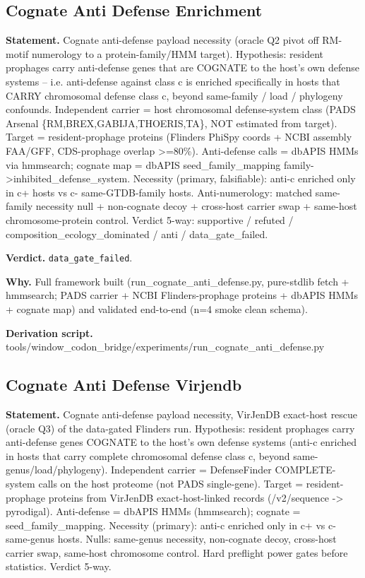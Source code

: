 \subsection{Cognate Anti Defense Enrichment}\label{sec:bridge-cognate-anti-defense-enrichment}
\textbf{Statement.} Cognate anti-defense payload necessity (oracle Q2 pivot off RM-motif numerology to a
protein-family/HMM target). Hypothesis: resident prophages carry anti-defense genes that are COGNATE
to the host's own defense systems -- i.e. anti-defense against class c is enriched specifically in
hosts that CARRY chromosomal defense class c, beyond same-family / load / phylogeny confounds.
Independent carrier = host chromosomal defense-system class (PADS Arsenal
\{RM,BREX,GABIJA,THOERIS,TA\}, NOT estimated from target). Target = resident-prophage proteins
(Flinders PhiSpy coords + NCBI assembly FAA/GFF, CDS-prophage overlap >=80\%). Anti-defense calls =
dbAPIS HMMs via hmmsearch; cognate map = dbAPIS seed\_family\_mapping
family->inhibited\_defense\_system. Necessity (primary, falsifiable): anti-c enriched only in c+
hosts vs c- same-GTDB-family hosts. Anti-numerology: matched same-family necessity null +
non-cognate decoy + cross-host carrier swap + same-host chromosome-protein control. Verdict 5-way:
supportive / refuted / composition\_ecology\_dominated / anti / data\_gate\_failed.

\textbf{Verdict.} \texttt{data\_gate\_failed}.

\textbf{Why.} Full framework built (run\_cognate\_anti\_defense.py, pure-stdlib fetch + hmmsearch; PADS carrier +
NCBI Flinders-prophage proteins + dbAPIS HMMs + cognate map) and validated end-to-end (n=4 smoke
clean schema).

\textbf{Derivation script.} tools/window\_codon\_bridge/experiments/run\_cognate\_anti\_defense.py

\subsection{Cognate Anti Defense Virjendb}\label{sec:bridge-cognate-anti-defense-virjendb}
\textbf{Statement.} Cognate anti-defense payload necessity, VirJenDB exact-host rescue (oracle Q3) of the data-gated
Flinders run. Hypothesis: resident prophages carry anti-defense genes COGNATE to the host's own
defense systems (anti-c enriched in hosts that carry complete chromosomal defense class c, beyond
same-genus/load/phylogeny). Independent carrier = DefenseFinder COMPLETE-system calls on the host
proteome (not PADS single-gene). Target = resident-prophage proteins from VirJenDB exact-host-linked
records (/v2/sequence -> pyrodigal). Anti-defense = dbAPIS HMMs (hmmsearch); cognate =
seed\_family\_mapping. Necessity (primary): anti-c enriched only in c+ vs c- same-genus hosts.
Nulls: same-genus necessity, non-cognate decoy, cross-host carrier swap, same-host chromosome
control. Hard preflight power gates before statistics. Verdict 5-way.

